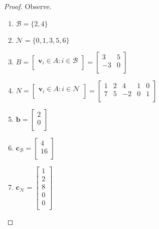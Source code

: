 \documentclass[12pt,oneside]{amsart}
\numberwithin{equation}{section}
\numberwithin{figure}{section}
\theoremstyle{plain}
\theoremstyle{definition}
\begin{document}
\begin{proof}
  Observe. \\
\begin{enumerate}
  \item $\mathscr{B} = \{2,4\}$ \\
  \item $\mathscr{N} = \{0,1,3,5,6\}$ \\
  \item $B = \begin{bmatrix}
      \mathbf{v}_i \in A : i \in \mathscr{B} \\
    \end{bmatrix} = \begin{bmatrix}
      3  & 5 \\
      -3 & 0 \\
    \end{bmatrix}$ \\ \hfill \break
  \item $N = \begin{bmatrix}
      \mathbf{v}_i \in A : i \in \mathscr{N} \\
    \end{bmatrix} = \begin{bmatrix}
      1 & 2 & 4  & 1 & 0 \\
      7 & 5 & -2 & 0 & 1 \\
    \end{bmatrix}$ \\ \hfill \break
  \item $\mathbf{b} = \begin{bmatrix}
      2 \\
      0 \\
    \end{bmatrix}$ \\ \hfill \break
  \item $\mathbf{c}_{\mathscr{B}} = \begin{bmatrix}
      4  \\
      16 \\
    \end{bmatrix}$ \\ \hfill \break
  \item $\mathbf{c}_{\mathscr{N}} = \begin{bmatrix}
      1 \\
      2 \\
      8 \\
      0 \\
      0 \\
    \end{bmatrix}$ \\ \hfill \break

\end{enumerate}
\end{proof}
\end{document}

